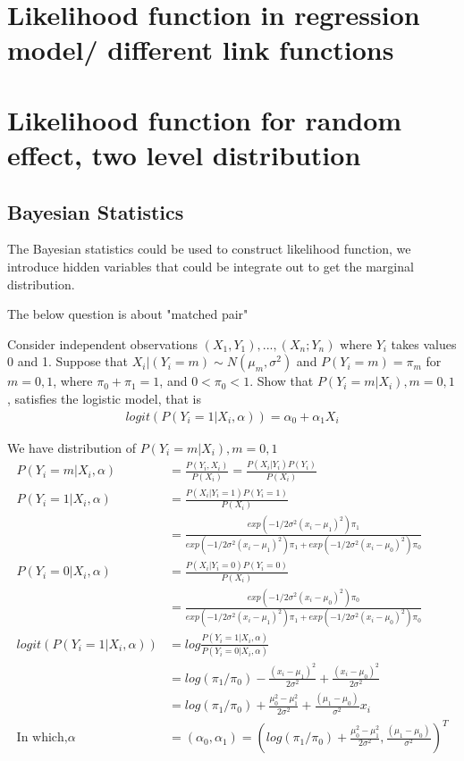 \documentclass[11pt]{article} %
\begin{document}
	\section{Likelihood function in regression model/ different link functions}
	
	
	\section{Likelihood function for random effect, two level distribution}
	
\subsection{Bayesian Statistics}
The Bayesian statistics could be used to construct likelihood function, we introduce hidden variables that could be integrate out to get the marginal distribution.

The below question is about "matched pair"

Consider independent observations $(X_1, Y_1),..., (X_n; Y_n)$ where $Y_i$ takes values 0 and
1. Suppose that $X_i|(Y_i = m) \sim N(\mu_m, \sigma^2)$ and $P(Y_i = m) = \pi_m$ for $m = 0, 1$, where
$\pi_0 + \pi_1 = 1$, and $0 < \pi_0 < 1$. Show that $P(Y_i = m|X_i), m = 0, 1$, satisfies the logistic model, that is
	\begin{align*}
		logit \left(P(Y_i = 1|X_i,\alpha) \right) = \alpha_0 + \alpha_1 X_i
	\end{align*}

	We have distribution of $P(Y_i = m|X_i), m = 0, 1$ 
	\begin{align*}
		P(Y_i=m |X_i,\alpha) & = \frac{P(Y_i, X_i)}{P(X_i)} = \frac{P(X_i|Y_i) P(Y_i)}{P(X_i)}\\
		P(Y_i=1 |X_i,\alpha) &= \frac{P(X_i|Y_i=1) P(Y_i=1)}{P(X_i)} \\
		&= \frac{exp(-1/2\sigma^2 (x_i-\mu_1)^2) \pi_1}{exp(-1/2\sigma^2 (x_i-\mu_1)^2) \pi_1 + exp(-1/2\sigma^2 (x_i-\mu_0)^2)  \pi_0}\\
		P(Y_i=0 |X_i,\alpha) &= \frac{P(X_i|Y_i=0) P(Y_i=0)}{P(X_i)}\\
		&= \frac{exp(-1/2\sigma^2 (x_i-\mu_0)^2)  \pi_0}{exp(-1/2\sigma^2 (x_i-\mu_1)^2) \pi_1 + exp(-1/2\sigma^2 (x_i-\mu_0)^2)  \pi_0}\\
		logit \left(P(Y_i = 1|X_i,\alpha) \right) &= log \frac{ P(Y_i=1 |X_i,\alpha)}{P(Y_i=0 |X_i,\alpha)} \\
		&= log(\pi_1/\pi_0) - \frac{(x_i-\mu_1)^2}{2\sigma^2} + \frac{(x_i-\mu_0)^2}{2\sigma^2}\\
		&= log(\pi_1/\pi_0) +\frac{\mu_0^2 - \mu_1^2}{2\sigma^2} + \frac{(\mu_1-\mu_0)}{\sigma^2}x_i\\
		\text{In which,}  \alpha &= (\alpha_0, \alpha_1) = \left(log(\pi_1/\pi_0) +\frac{\mu_0^2 - \mu_1^2}{2\sigma^2},  \frac{(\mu_1-\mu_0)}{\sigma^2} \right)^T
	\end{align*}
     
\end{document}
